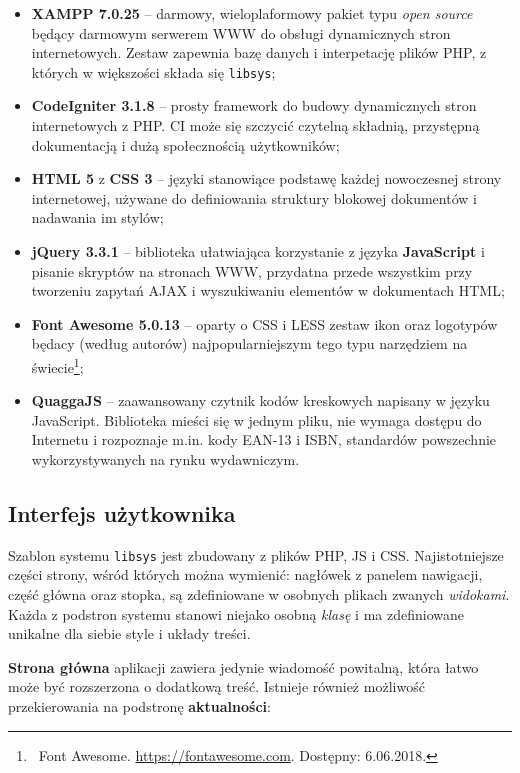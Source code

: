 \documentclass[12pt, a4paper]{article}
\begin{document}
\begin{itemize}
    \item \textbf{XAMPP 7.0.25} -- darmowy, wieloplaformowy pakiet typu \textit{open source} będący darmowym serwerem WWW do obsługi dynamicznych stron internetowych. Zestaw zapewnia bazę danych i interpetację plików PHP, z których w większości składa się \texttt{libsys};
    \item \textbf{CodeIgniter 3.1.8} -- prosty framework do budowy dynamicznych stron internetowych z PHP. CI może się szczycić czytelną składnią, przystępną dokumentacją i dużą społecznością użytkowników; 
    \item \textbf{HTML 5} z \textbf{CSS 3} -- języki stanowiące podstawę każdej nowoczesnej strony internetowej, używane do definiowania struktury blokowej dokumentów i nadawania im stylów;
    \item \textbf{jQuery 3.3.1} -- biblioteka ułatwiająca korzystanie z języka \textbf{JavaScript} i pisanie skryptów na stronach WWW, przydatna przede wszystkim przy tworzeniu zapytań AJAX i wyszukiwaniu elementów w dokumentach HTML;
    \item \textbf{Font Awesome 5.0.13} -- oparty o CSS i LESS zestaw ikon oraz logotypów będacy (według autorów) najpopularniejszym tego typu narzędziem na świecie\footnote{\ Font Awesome. \url{https://fontawesome.com}. Dostępny: 6.06.2018.};
    \item \textbf{QuaggaJS} -- zaawansowany czytnik kodów kreskowych napisany w języku JavaScript. Biblioteka mieści się w jednym pliku, nie wymaga dostępu do Internetu i rozpoznaje m.in. kody EAN-13 i ISBN, standardów powszechnie wykorzystywanych na rynku wydawniczym.
\end{itemize}

\newpage
\subsection{Interfejs użytkownika}

Szablon systemu \texttt{libsys} jest zbudowany z plików PHP, JS i CSS. Najistotniejsze części strony, wśród których można wymienić: nagłówek z panelem nawigacji, część główna oraz stopka, są zdefiniowane w osobnych plikach zwanych \textit{widokami}. Każda z podstron systemu stanowi niejako osobną \textit{klasę} i ma zdefiniowane unikalne dla siebie style i układy treści.

\textbf{Strona główna} aplikacji zawiera jedynie wiadomość powitalną, która łatwo może być rozszerzona o dodatkową treść. Istnieje również możliwość przekierowania na podstronę \textbf{aktualności}:
\end{document}
